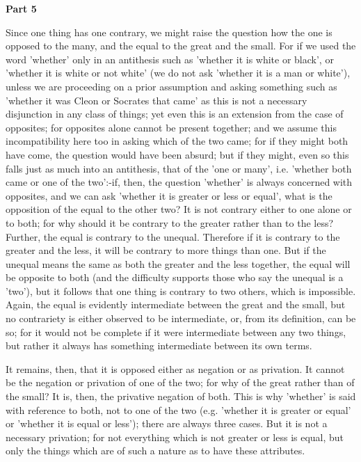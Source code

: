 \textbf{Part 5}

Since one thing has one contrary, we might raise the question how the one is opposed to the many, and the equal to the great and the small. For if we used the word 'whether' only in an antithesis such as 'whether it is white or black', or 'whether it is white or not white' (we do not ask 'whether it is a man or white'), unless we are proceeding on a prior assumption and asking something such as 'whether it was Cleon or Socrates that came' as this is not a necessary disjunction in any class of things; yet even this is an extension from the case of opposites; for opposites alone cannot be present together; and we assume this incompatibility here too in asking which of the two came; for if they might both have come, the question would have been absurd; but if they might, even so this falls just as much into an antithesis, that of the 'one or many', i.e. 'whether both came or one of the two':-if, then, the question 'whether' is always concerned with opposites, and we can ask 'whether it is greater or less or equal', what is the opposition of the equal to the other two? It is not contrary either to one alone or to both; for why should it be contrary to the greater rather than to the less? Further, the equal is contrary to the unequal. Therefore if it is contrary to the greater and the less, it will be contrary to more things than one. But if the unequal means the same as both the greater and the less together, the equal will be opposite to both (and the difficulty supports those who say the unequal is a 'two'), but it follows that one thing is contrary to two others, which is impossible. Again, the equal is evidently intermediate between the great and the small, but no contrariety is either observed to be intermediate, or, from its definition, can be so; for it would not be complete if it were intermediate between any two things, but rather it always has something intermediate between its own terms.

It remains, then, that it is opposed either as negation or as privation. It cannot be the negation or privation of one of the two; for why of the great rather than of the small? It is, then, the privative negation of both. This is why 'whether' is said with reference to both, not to one of the two (e.g. 'whether it is greater or equal' or 'whether it is equal or less'); there are always three cases. But it is not a necessary privation; for not everything which is not greater or less is equal, but only the things which are of such a nature as to have these attributes.

